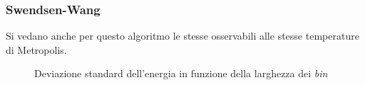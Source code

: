 \subsubsection*{Swendsen-Wang}
Si vedano anche per questo algoritmo le stesse osservabili alle stesse temperature di Metropolis. 
\begin{figure}[h!]
\caption{Deviazione standard dell'energia in funzione della larghezza dei \emph{bin} }
\end{figure}
